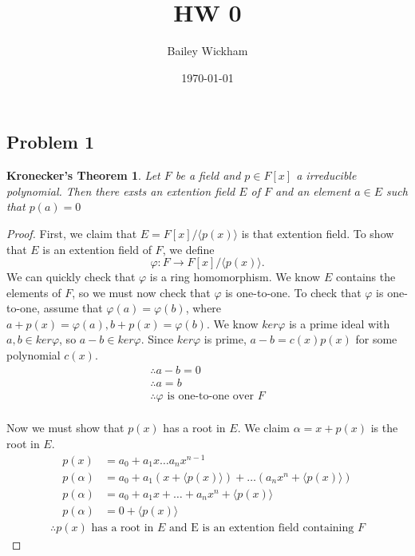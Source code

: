 \documentclass{article}
\title{HW 0}
\author{Bailey Wickham}
\date\today
\newtheorem*{theorem}{Kronecker's Theorem}
\begin{document}
\maketitle

\subsection*{Problem 1}
\begin{theorem}
    Let $F$ be a field and $p \in F[x]$ a irreducible polynomial. Then there exsts an extention field $E$ of $F$ and an element $a \in E$ such that $p(a) = 0$
\end{theorem}
\begin{proof}
First, we claim that $E = F[x]/\langle p(x)\rangle$ is that extention field. To show that $E$ is an extention field of $F$, we define
\begin{equation*}
   \varphi: F\to F[x]/\langle p(x)\rangle.
\end{equation*}
We can quickly check that $\varphi$ is a ring homomorphism. We know $E$ contains the elements of $F$, so we must now check that $\varphi$ is one-to-one. To check that $\varphi$ is one-to-one, assume that $\varphi(a) = \varphi(b)$, where $a + p(x) = \varphi(a), b + p(x) = \varphi(b)$. We know $ker \varphi$ is a prime ideal with $a,b \in ker\varphi$, so $a-b \in ker\varphi $. Since $ker\varphi$ is prime, $a-b=c(x)p(x)$ for some polynomial $c(x)$.
\begin{gather*}
\therefore a-b=0 \\
\therefore a=b \\
\therefore \varphi \text{ is one-to-one over } F
\end{gather*}
\\ Now we must show that $p(x)$ has a root in $E$. We claim $\alpha = x + p(x)$ is the root in $E$.
\begin{align*}
    p(x) &= a_0 + a_1 x \dots a_n x^{n-1}\\
    p(\alpha) &= a_0 + a_1(x + \langle p(x) \rangle ) + \dots (a_nx^n + \langle p(x) \rangle ) \\
    p(\alpha) &= a_0 + a_1x + \dots + a_nx^n + \langle p(x) \rangle \\
    p(\alpha) &= 0 + \langle p(x) \rangle
\end{align*}
\begin{gather*}
    \therefore p(x) \text{ has a root in } E \text{ and E is an extention field containing } F
\end{gather*}


\end{proof}
\end{document}
